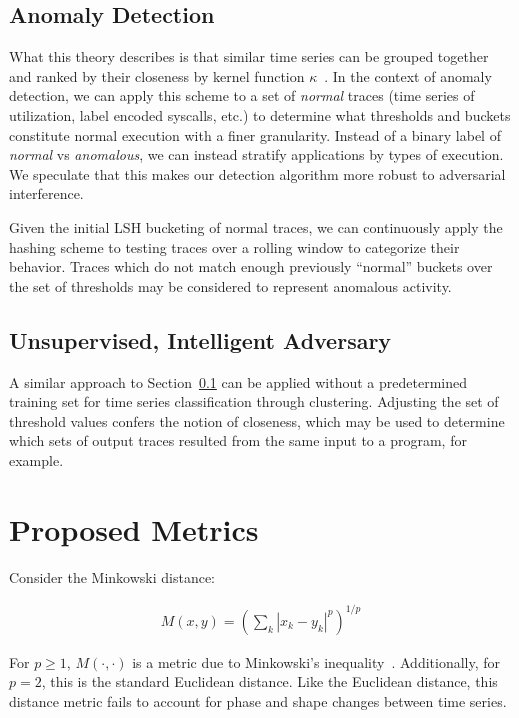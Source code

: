 \documentclass[a4paper]{article}
\begin{document}
\subsection{Anomaly Detection}
\label{subsec:anomaly_detection}

What this theory describes is that similar time series can be grouped together and ranked by their closeness by kernel function $\kappa$~\cite{Hachiya13-NSH}.
In the context of anomaly detection, we can apply this scheme to a set of \textit{normal} traces (time series of utilization, label encoded syscalls, etc.) to determine what thresholds and buckets constitute normal execution with a finer granularity.
Instead of a binary label of \textit{normal} vs \textit{anomalous}, we can instead stratify applications by types of execution.
We speculate that this makes our detection algorithm more robust to adversarial interference.

Given the initial LSH bucketing of normal traces, we can continuously apply the hashing scheme to testing traces over a rolling window to categorize their behavior.
Traces which do not match enough previously ``normal'' buckets over the set of thresholds may be considered to represent anomalous activity.


\subsection{Unsupervised, Intelligent Adversary}

A similar approach to Section~\ref{subsec:anomaly_detection} can be applied without a predetermined training set for time series classification through clustering.
Adjusting the set of threshold values confers the notion of closeness, which may be used to determine which sets of output traces resulted from the same input to a program, for example.

\section{Proposed Metrics}

Consider the Minkowski distance:

\begin{align*}
    M(x,y) = {(\sum\limits_k |x_k - y_k|^p)}^{1/p}
\end{align*}

For $p \ge 1$, $M(\cdot,\cdot)$ is a metric due to Minkowski's inequality~\cite[p. 190]{wheeden15-measure}.
Additionally, for $p = 2$, this is the standard Euclidean distance.
Like the Euclidean distance, this distance metric fails to account for phase and shape changes between time series.
\end{document}
